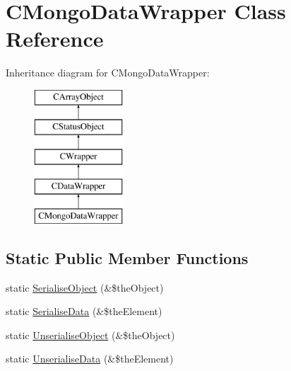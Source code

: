 \hypertarget{class_c_mongo_data_wrapper}{\section{C\-Mongo\-Data\-Wrapper Class Reference}
\label{class_c_mongo_data_wrapper}
}
Inheritance diagram for C\-Mongo\-Data\-Wrapper\-:\begin{figure}[H]
\begin{center}
\leavevmode
\includegraphics[height=5.000000cm]{class_c_mongo_data_wrapper}
\end{center}
\end{figure}
\subsection*{Static Public Member Functions}
\begin{DoxyCompactItemize}
\item 
static \hyperlink{class_c_mongo_data_wrapper_a0d37f7b47e1a1ac48846f6d10d08d846}{Serialise\-Object} (\&\$the\-Object)
\item 
static \hyperlink{class_c_mongo_data_wrapper_a4a23d055b9735b8ba53102e619f94ffb}{Serialise\-Data} (\&\$the\-Element)
\item 
static \hyperlink{class_c_mongo_data_wrapper_aff82f7c69fa3641daf93d1f375e33501}{Unserialise\-Object} (\&\$the\-Object)
\item 
static \hyperlink{class_c_mongo_data_wrapper_a581d27ffad3ff0a68c5bd6123abece01}{Unserialise\-Data} (\&\$the\-Element)
\end{DoxyCompactItemize}
